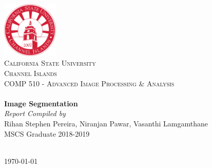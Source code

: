 \begin{titlepage}
\begin{center}
\includegraphics[width=0.20\textwidth]{img/csuci_logo.png}~\\[1cm]

\textsc{\LARGE California State University}\\[0.2cm]
\textsc{\LARGE Channel Islands}\\[1.5cm]

\textsc{\Large COMP 510 - Advanced Image Processing \& Analysis}\\[0.5cm]

\HRule \\[0.4cm]
{ \huge \bfseries Image Segmentation}\\[0.1cm]
{\textit{Report Compiled by}}\\[0.1cm]
{\large {Rihan Stephen Pereira, Niranjan Pawar, Vasanthi Lamgamthane}}\\[0.2cm]
{\Large {MSCS Graduate 2018-2019}}\\[0.2cm]
\HRule \\[1.5cm]


\vfill

{\large \today}
\end{center}
\end{titlepage}

